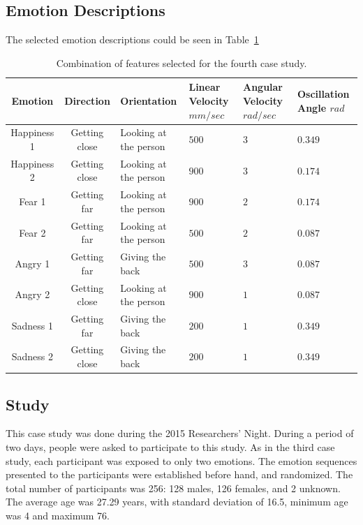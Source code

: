 \subsection{Emotion Descriptions} 
The selected emotion descriptions could be seen in Table~\ref{table:features_2}
\begin{table}[tbh]
\begin{center}
\caption{Combination of features selected for the fourth case study.}
\label{table:features_2}
\small
\begin{tabular}{|c|c|p{2.5 cm}|p{2 cm}|p{2 cm}|p{2.5cm}|}
\hline 
\textbf{Emotion} & \textbf{Direction} & \textbf{Orientation} & \textbf{Linear Velocity} $mm/sec$& \textbf{Angular Velocity} $rad/sec$& \textbf{Oscillation Angle} $rad$\\
\hline
Happiness 1 & Getting close & Looking at the person & $500$  & $3$ & $0.349$ \\
\hline
Happiness 2 & Getting close & Looking at the person & $900$ & $3$ & $0.174$ \\
\hline
Fear 1 & Getting far & Looking at the person & $900$ & $2$ & $0.174$ \\
\hline
Fear 2 & Getting far & Looking at the person & $500$ & $2$ & $0.087$ \\
\hline
Angry 1 & Getting far & Giving the back & $500$ & $3$ & $0.087$ \\
\hline
Angry 2 & Getting close & Looking at the person & $900$ & $1$ & $0.087$ \\
\hline
Sadness 1 & Getting far & Giving the back & $200$ & $1$ & $0.349$ \\
\hline
Sadness 2 & Getting close & Giving the back & $200$ & $1$  & $0.349$ \\
\hline
\end{tabular}
\end{center}
\end{table} 
\subsection{Study}
This case study was done during the 2015 Researchers' Night. During a period of two days, people were asked to participate to this study. As in the third case study, each participant was exposed to only two emotions. The emotion sequences presented to the participants were established before hand, and randomized. The total number of participants was 256: 128 males, 126 females, and 2 unknown. The average age was 27.29 years, with standard deviation of 16.5, minimum age was 4 and maximum 76. 
